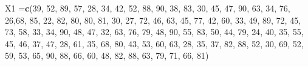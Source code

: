 \documentclass[
]{book}
\newenvironment{Shaded}{\begin{snugshade}}{\end{snugshade}}
\newcommand{\DecValTok}[1]{\textcolor[rgb]{0.00,0.00,0.81}{#1}}
\newcommand{\FunctionTok}[1]{\textcolor[rgb]{0.13,0.29,0.53}{\textbf{#1}}}
\newcommand{\NormalTok}[1]{#1}
\newcommand{\OtherTok}[1]{\textcolor[rgb]{0.56,0.35,0.01}{#1}}
\begin{document}
\begin{Shaded}
\begin{Highlighting}[]
\NormalTok{X1 }\OtherTok{=}\FunctionTok{c}\NormalTok{(}\DecValTok{39}\NormalTok{, }\DecValTok{52}\NormalTok{, }\DecValTok{89}\NormalTok{, }\DecValTok{57}\NormalTok{, }\DecValTok{28}\NormalTok{, }\DecValTok{34}\NormalTok{, }\DecValTok{42}\NormalTok{, }\DecValTok{52}\NormalTok{, }\DecValTok{88}\NormalTok{, }\DecValTok{90}\NormalTok{, }\DecValTok{38}\NormalTok{, }\DecValTok{83}\NormalTok{, }\DecValTok{30}\NormalTok{, }\DecValTok{45}\NormalTok{, }\DecValTok{47}\NormalTok{, }\DecValTok{90}\NormalTok{, }\DecValTok{63}\NormalTok{, }\DecValTok{34}\NormalTok{, }
      \DecValTok{76}\NormalTok{, }\DecValTok{26}\NormalTok{,}\DecValTok{68}\NormalTok{,  }\DecValTok{85}\NormalTok{, }\DecValTok{22}\NormalTok{, }\DecValTok{82}\NormalTok{, }\DecValTok{80}\NormalTok{, }\DecValTok{80}\NormalTok{, }\DecValTok{81}\NormalTok{, }\DecValTok{30}\NormalTok{, }\DecValTok{27}\NormalTok{, }\DecValTok{72}\NormalTok{, }\DecValTok{46}\NormalTok{, }\DecValTok{63}\NormalTok{, }\DecValTok{45}\NormalTok{, }\DecValTok{77}\NormalTok{, }\DecValTok{42}\NormalTok{, }\DecValTok{60}\NormalTok{, }
      \DecValTok{33}\NormalTok{, }\DecValTok{49}\NormalTok{, }\DecValTok{89}\NormalTok{, }\DecValTok{72}\NormalTok{, }\DecValTok{45}\NormalTok{, }\DecValTok{73}\NormalTok{, }\DecValTok{58}\NormalTok{, }\DecValTok{33}\NormalTok{, }\DecValTok{34}\NormalTok{, }\DecValTok{90}\NormalTok{, }\DecValTok{48}\NormalTok{, }\DecValTok{47}\NormalTok{, }\DecValTok{32}\NormalTok{, }\DecValTok{63}\NormalTok{, }\DecValTok{76}\NormalTok{, }\DecValTok{79}\NormalTok{, }\DecValTok{48}\NormalTok{, }\DecValTok{90}\NormalTok{, }
      \DecValTok{55}\NormalTok{, }\DecValTok{83}\NormalTok{, }\DecValTok{50}\NormalTok{, }\DecValTok{44}\NormalTok{, }\DecValTok{79}\NormalTok{, }\DecValTok{24}\NormalTok{, }\DecValTok{40}\NormalTok{, }\DecValTok{35}\NormalTok{, }\DecValTok{55}\NormalTok{, }\DecValTok{45}\NormalTok{, }\DecValTok{46}\NormalTok{, }\DecValTok{37}\NormalTok{, }\DecValTok{47}\NormalTok{, }\DecValTok{28}\NormalTok{, }\DecValTok{61}\NormalTok{, }\DecValTok{35}\NormalTok{, }\DecValTok{68}\NormalTok{, }\DecValTok{80}\NormalTok{, }
      \DecValTok{43}\NormalTok{, }\DecValTok{53}\NormalTok{, }\DecValTok{60}\NormalTok{, }\DecValTok{63}\NormalTok{, }\DecValTok{28}\NormalTok{, }\DecValTok{35}\NormalTok{, }\DecValTok{37}\NormalTok{, }\DecValTok{82}\NormalTok{, }\DecValTok{88}\NormalTok{, }\DecValTok{52}\NormalTok{, }\DecValTok{30}\NormalTok{, }\DecValTok{69}\NormalTok{, }\DecValTok{52}\NormalTok{, }\DecValTok{59}\NormalTok{, }\DecValTok{53}\NormalTok{, }\DecValTok{65}\NormalTok{, }\DecValTok{90}\NormalTok{, }\DecValTok{88}\NormalTok{, }
      \DecValTok{66}\NormalTok{, }\DecValTok{60}\NormalTok{, }\DecValTok{48}\NormalTok{, }\DecValTok{82}\NormalTok{, }\DecValTok{88}\NormalTok{, }\DecValTok{63}\NormalTok{, }\DecValTok{79}\NormalTok{, }\DecValTok{71}\NormalTok{, }\DecValTok{66}\NormalTok{, }\DecValTok{81}\NormalTok{)}


\end{Highlighting}
\end{Shaded}
\end{document}
